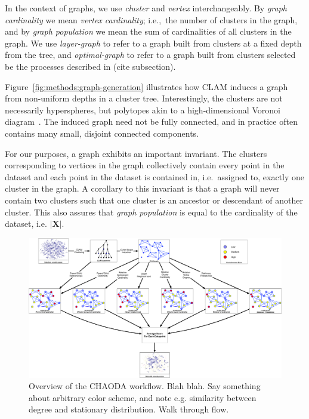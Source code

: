 In the context of graphs, we use \textit{cluster} and \textit{vertex} interchangeably.
By \textit{graph cardinality} we mean \textit{vertex cardinality}; i.e.,\ the number of clusters in the graph, and by \textit{graph population} we mean the sum of cardinalities of all clusters in the graph.
We use \textit{layer-graph} to refer to a graph built from clusters at a fixed depth from the tree, and \textit{optimal-graph} to refer to a graph built from clusters selected be the processes described in (cite subsection).

Figure~\ref{fig:methods:graph-generation} illustrates how CLAM induces a graph from non-uniform depths in a cluster tree.
Interestingly, the clusters are not necessarily hyperspheres, but polytopes akin to a high-dimensional Voronoi diagram~\cite{voronoi1908nouvelles}.
The induced graph need not be fully connected, and in practice often contains many small, disjoint connected components.

For our purposes, a graph exhibits an important invariant.
The clusters corresponding to vertices in the graph collectively contain every point in the dataset and each point in the dataset is contained in, i.e.\ assigned to, exactly one cluster in the graph.
A corollary to this invariant is that a graph will never contain two clusters such that one cluster is an ancestor or descendant of another cluster.
This also assures that \textit{graph population} is equal to the cardinality of the dataset, i.e. $|\textbf{X}|$.

\begin{figure}[ht!]
    \centering
    \includegraphics[width=6in]{images/chaoda-workflow.pdf}
    \caption{Overview of the CHAODA workflow.
        Blah blah. Say something about arbitrary color scheme, and note e.g. similarity between degree and stationary distribution. Walk through flow.}
    \label{fig:methods:chaoda-workflow}
\end{figure}


